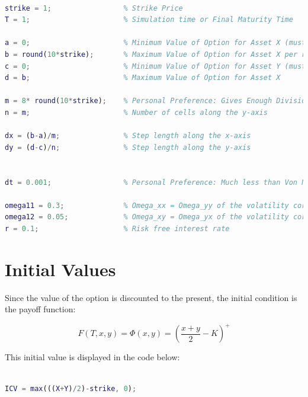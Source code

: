 \documentclass[12pt,letterpaper]{article}
\begin{document}
\begin{lstlisting}[language = Matlab]
%% Parameters

strike = 1;                 % Strike Price
T = 1;                      % Simulation time or Final Maturity Time

a = 0;                      % Minimum Value of Option for Asset X (must be zero)
b = round(10*strike);       % Maximum Value of Option for Asset X per recommendation of reference paper (between 8*K and 12*K)
c = 0;                      % Minimum Value of Option for Asset Y (must be zero)
d = b;                      % Maximum Value of Option for Asset X

m = 8* round(10*strike);    % Personal Preference: Gives Enough Divisions for a More Accurate Result
n = m;                      % Number of cells along the y-axis

dx = (b-a)/m;               % Step length along the x-axis
dy = (d-c)/n;               % Step length along the y-axis


dt = 0.001;                 % Personal Preference: Much less than Von Neumann stability criterion for explicit scheme dx^2/(4) (about 0.0039)

omega11 = 0.3;              % Omega_xx = Omega_yy of the volatility correlation matrix
omega12 = 0.05;             % Omega_xy = Omega_yx of the volatility correlation matrix
r = 0.1;                    % Risk free interest rate
\end{lstlisting}

\newpage

\section*{Initial Values}
Since the value of the option is discounted to the present, the initial condition is the payoff function:

\begin{equation*}
    F(T,x,y) = \Phi(x,y) = \left(\frac{x+y}{2}-K\right)^{+}
\end{equation*}

This initial value is displayed in the code below:

\begin{lstlisting}[language = Matlab]
%% Initial Values for time = T

ICV = max(((X+Y)/2)-strike, 0);
\end{lstlisting}


\newpage
\end{document}
